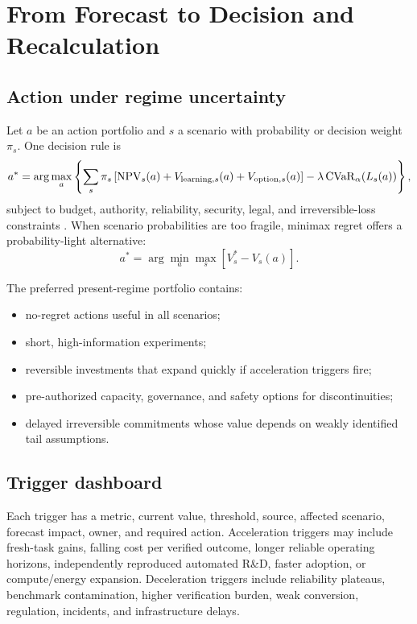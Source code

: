 
\section{From Forecast to Decision and Recalculation}

\subsection{Action under regime uncertainty}

Let $a$ be an action portfolio and $s$ a scenario with probability or decision weight $\pi_s$. One decision rule is
\begin{equation}
\label{eq:decision}
a^*=\arg\max_a\left\{\sum_s\pi_s\left[\mathrm{NPV}_s(a)+V_{\mathrm{learning},s}(a)+V_{\mathrm{option},s}(a)\right]-\lambda\operatorname{CVaR}_\alpha(L_s(a))\right\},
\end{equation}
subject to budget, authority, reliability, security, legal, and irreversible-loss constraints \citep{rockafellar2000}. When scenario probabilities are too fragile, minimax regret offers a probability-light alternative:
\begin{equation}
a^*=\arg\min_a\max_s\left[V_s^*-V_s(a)\right].
\end{equation}

The preferred present-regime portfolio contains:
\begin{itemize}
\item no-regret actions useful in all scenarios;
\item short, high-information experiments;
\item reversible investments that expand quickly if acceleration triggers fire;
\item pre-authorized capacity, governance, and safety options for discontinuities;
\item delayed irreversible commitments whose value depends on weakly identified tail assumptions.
\end{itemize}

\subsection{Trigger dashboard}

Each trigger has a metric, current value, threshold, source, affected scenario, forecast impact, owner, and required action. Acceleration triggers may include fresh-task gains, falling cost per verified outcome, longer reliable operating horizons, independently reproduced automated R\&D, faster adoption, or compute/energy expansion. Deceleration triggers include reliability plateaus, benchmark contamination, higher verification burden, weak conversion, regulation, incidents, and infrastructure delays.

